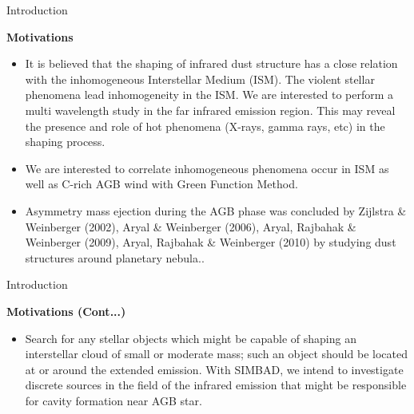 \documentclass[12pt,a4paper]{beamer}
\begin{document}
\begin{frame}
\begin{center}
\Large\bf\color{red}{Introduction}
\end{center}
\end{frame}

\begin{frame}{Introduction}
\begin{block}{\centering\textbf{Motivations \vspace*{.25cm}}}
\begin{itemize}
\item  It is believed that the shaping of infrared dust structure
has a close relation with the inhomogeneous Interstellar Medium
(ISM). The violent stellar phenomena lead inhomogeneity in the
ISM. We are interested to perform a multi wavelength study in the
far infrared emission region. This may reveal the presence and
role of hot phenomena (X-rays, gamma rays, etc) in the shaping
process. \item  We are interested to correlate inhomogeneous
phenomena occur in ISM as well as C-rich AGB wind with Green
Function Method.
 \item Asymmetry mass ejection during the AGB phase was concluded
 by Zijlstra \& Weinberger (2002), Aryal \& Weinberger (2006), Aryal, Rajbahak \& Weinberger
(2009), Aryal, Rajbahak \& Weinberger (2010) by studying dust
structures around planetary nebula.\cite{6,7,8,9}.
\end{itemize}
\end{block}
\end{frame}

\begin{frame}{Introduction}
\begin{block}{\centering\textbf{Motivations \vspace*{.25cm} (Cont...)}}
\begin{itemize}
\item Search for any stellar
objects which might be capable of shaping an interstellar cloud of
small or moderate mass; such an object should be located at or
around the extended emission.\cite{9} With SIMBAD, we intend to
investigate discrete sources in the field of the infrared emission
that might be responsible for cavity formation near AGB star.
\end{itemize}
\end{block}
\end{frame}
\end{document}
